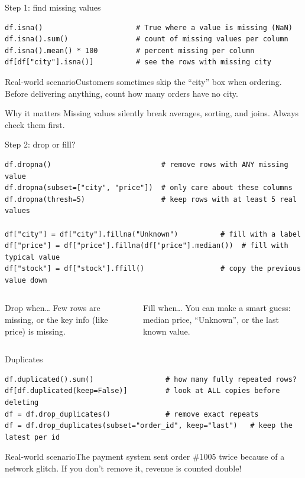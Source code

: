 \documentclass[aspectratio=169,10pt]{beamer}
\newcommand{\scenario}[1]{\begin{exampleblock}{Real-world scenario}#1\end{exampleblock}}
\begin{document}
\begin{frame}[fragile]{Step 1: find missing values}
\begin{lstlisting}
df.isna()                      # True where a value is missing (NaN)
df.isna().sum()                # count of missing values per column
df.isna().mean() * 100         # percent missing per column
df[df["city"].isna()]          # see the rows with missing city
\end{lstlisting}
  \scenario{Customers sometimes skip the ``city'' box when ordering. Before delivering
  anything, count how many orders have no city.}
  \begin{block}{Why it matters}
    Missing values silently break averages, sorting, and joins. Always check them first.
  \end{block}
\end{frame}

\begin{frame}[fragile]{Step 2: drop or fill?}
\begin{lstlisting}
df.dropna()                          # remove rows with ANY missing value
df.dropna(subset=["city", "price"])  # only care about these columns
df.dropna(thresh=5)                  # keep rows with at least 5 real values

df["city"] = df["city"].fillna("Unknown")          # fill with a label
df["price"] = df["price"].fillna(df["price"].median())  # fill with typical value
df["stock"] = df["stock"].ffill()                  # copy the previous value down
\end{lstlisting}
  \begin{columns}[T]
    \begin{block}{Drop when\dots}
      Few rows are missing, or the key info (like price) is missing.
    \end{block}
    \begin{block}{Fill when\dots}
      You can make a smart guess: median price, ``Unknown'', or the last known value.
    \end{block}
  \end{columns}
\end{frame}

\begin{frame}[fragile]{Duplicates}
\begin{lstlisting}
df.duplicated().sum()                 # how many fully repeated rows?
df[df.duplicated(keep=False)]         # look at ALL copies before deleting
df = df.drop_duplicates()             # remove exact repeats
df = df.drop_duplicates(subset="order_id", keep="last")   # keep the latest per id
\end{lstlisting}
  \scenario{The payment system sent order \#1005 twice because of a network glitch. If you
  don't remove it, revenue is counted double!}
\end{frame}
\end{document}
